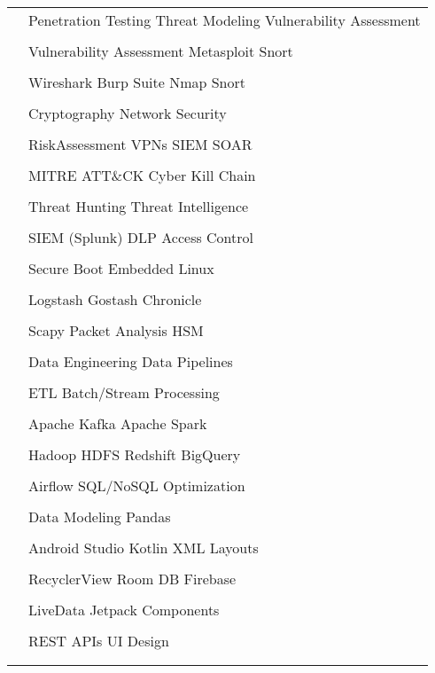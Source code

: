 \documentclass[12pt]{article}
\newcommand{\tableentry}[3]{\textsc{#1} & #2\expandafter\ifstrequal\expandafter{#3}{}{\\}{\\[6pt]}}
\begin{document}
\begin{paracol}{2}
\begin{supertabular}{rl}
			
			\tableentry{\footnotesize\faLock}{Penetration Testing \textperiodcentered{} Threat Modeling \textperiodcentered{} Vulnerability Assessment}{}
			\tableentry{}{Vulnerability Assessment \textperiodcentered{} Metasploit \textperiodcentered{} Snort}{}
			\tableentry{}{Wireshark \textperiodcentered{} Burp Suite \textperiodcentered{} Nmap \textperiodcentered{} Snort}{}
			\tableentry{}{Cryptography \textperiodcentered{} Network Security \textperiodcentered{}}{}
			\tableentry{}{ RiskAssessment \textperiodcentered{} VPNs \textperiodcentered{} SIEM \textperiodcentered{} SOAR}{}
			\tableentry{}{MITRE ATT\&CK \textperiodcentered{} Cyber Kill Chain }{}
			\tableentry{}{Threat Hunting \textperiodcentered{} Threat Intelligence}{}
			\tableentry{}{SIEM (Splunk) \textperiodcentered{} DLP \textperiodcentered{} Access Control}{}
			\tableentry{}{Secure Boot \textperiodcentered{}  Embedded Linux \textperiodcentered{}}{}
			\tableentry{}{Logstash \textperiodcentered{} Gostash \textperiodcentered{} Chronicle }{}
			\tableentry{}{Scapy \textperiodcentered{}  Packet Analysis \textperiodcentered{} HSM}{}
			
			
			
			
			\tableentry{\footnotesize\faDatabase}{Data Engineering \textperiodcentered{} Data Pipelines \textperiodcentered{}}{}
			\tableentry{}{ETL \textperiodcentered{} Batch/Stream Processing}{}
			\tableentry{}{Apache Kafka \textperiodcentered{} Apache Spark \textperiodcentered{}}{}
			\tableentry{}{Hadoop \textperiodcentered{} HDFS \textperiodcentered{} Redshift \textperiodcentered{} BigQuery}{}
			\tableentry{}{Airflow \textperiodcentered{} SQL/NoSQL Optimization \textperiodcentered{}}{}
			\tableentry{}{Data Modeling \textperiodcentered{} Pandas}{}
			
			\tableentry{\footnotesize\faMobile}{Android Studio \textperiodcentered{}  Kotlin \textperiodcentered{} XML Layouts}{}
			\tableentry{}{RecyclerView \textperiodcentered{} Room DB \textperiodcentered{} Firebase \textperiodcentered{}}{}
			\tableentry{}{LiveData \textperiodcentered{} Jetpack Components}{}
			\tableentry{}{REST APIs \textperiodcentered{} UI Design}{}
			
			
		\end{supertabular}

		
		
		
		
		

\end{paracol}
\end{document}
